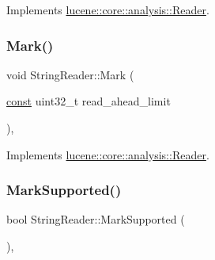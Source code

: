 Implements \mbox{\hyperlink{classlucene_1_1core_1_1analysis_1_1Reader_af7a24f3904f9c40e9c5c204b3434f1f7}{lucene\+::core\+::analysis\+::\+Reader}}.

\mbox{\label{classlucene_1_1core_1_1analysis_1_1StringReader_a0ba42881881e4790dae54bc1c01063f5}} 
\subsubsection{\texorpdfstring{Mark()}{Mark()}}
{\footnotesize\ttfamily void String\+Reader\+::\+Mark (\begin{DoxyParamCaption}\item[{\mbox{\hyperlink{ZlibCrc32_8h_a2c212835823e3c54a8ab6d95c652660e}{const}} uint32\+\_\+t}]{read\+\_\+ahead\+\_\+limit }\end{DoxyParamCaption})\hspace{0.3cm}{\ttfamily [override]}, {\ttfamily [virtual]}}



Implements \mbox{\hyperlink{classlucene_1_1core_1_1analysis_1_1Reader_a0b60b07a3f65098a50f10f6618097527}{lucene\+::core\+::analysis\+::\+Reader}}.

\mbox{\label{classlucene_1_1core_1_1analysis_1_1StringReader_a1b9e55036f01d10650fd4026f23da629}} 
\subsubsection{\texorpdfstring{Mark\+Supported()}{MarkSupported()}}
{\footnotesize\ttfamily bool String\+Reader\+::\+Mark\+Supported (\begin{DoxyParamCaption}{ }\end{DoxyParamCaption})\hspace{0.3cm}{\ttfamily [override]}, {\ttfamily [virtual]}}



